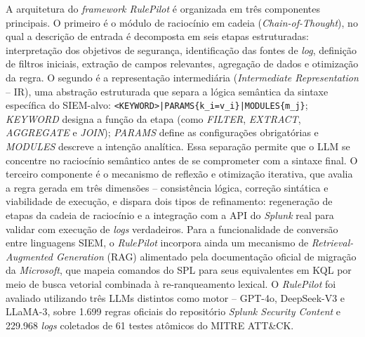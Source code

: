 A arquitetura do \textit{framework RulePilot} é organizada em três componentes principais. 
O primeiro é o módulo de raciocínio em cadeia (\textit{Chain-of-Thought}), no qual a descrição de entrada é decomposta em seis etapas estruturadas: 
interpretação dos objetivos de segurança, identificação das fontes de \textit{log}, definição de filtros iniciais, extração de campos relevantes, agregação de dados e otimização da regra. 
O segundo é a representação intermediária (\textit{Intermediate Representation} -- IR), uma abstração estruturada que separa a lógica semântica da sintaxe específica do \gls{SIEM}-alvo: \texttt{<KEYWORD>|PARAMS\{k\_i=v\_i\}|MODULES\{m\_j\}}; 
\textit{KEYWORD} designa a função da etapa (como \textit{FILTER}, \textit{EXTRACT}, \textit{AGGREGATE} e \textit{JOIN}); 
\textit{PARAMS} define as configurações obrigatórias e \textit{MODULES} descreve a intenção analítica. 
Essa separação permite que o LLM se concentre no raciocínio semântico antes de se comprometer com a sintaxe final. 
O terceiro componente é o mecanismo de reflexão e otimização iterativa, que avalia a regra gerada em três dimensões -- consistência lógica, correção sintática e viabilidade de execução, e dispara dois tipos de refinamento: regeneração de etapas da cadeia de raciocínio e a integração com a API do \textit{Splunk} real para validar com execução de \textit{logs} verdadeiros. 
Para a funcionalidade de conversão entre linguagens \gls{SIEM}, o \textit{RulePilot} incorpora ainda um mecanismo de \textit{Retrieval-Augmented Generation} (RAG) alimentado pela documentação oficial de migração da \textit{Microsoft}, que mapeia comandos do SPL para seus equivalentes em KQL por meio de busca vetorial combinada à re-ranqueamento lexical.
O \textit{RulePilot} foi avaliado utilizando três LLMs distintos como motor -- \gls{GPT}-4o, \gls{DeepSeek}-V3 e \gls{LLaMA}-3, sobre 1.699 regras oficiais do repositório \textit{Splunk Security Content} e 229.968 \textit{logs} coletados de 61 testes atômicos do \gls{MITRE} ATT&CK.

